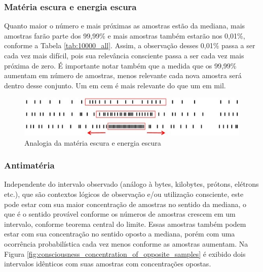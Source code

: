 \subsubsection{Matéria escura e energia escura}
Quanto maior o número e mais próximas as amostras estão da mediana, mais amostras farão parte dos 99,99\% e mais amostras também estarão nos 0,01\%, conforme a Tabela \ref{tab:10000_all}. Assim, a observação desses 0,01\% passa a ser cada vez mais difícil, pois sua relevância consciente passa a ser cada vez mais próxima de zero. É importante notar também que a medida que os 99,99\% aumentam em número de amostras, menos relevante cada nova amostra será dentro desse conjunto. Um em cem é mais relevante do que um em mil. 

\begin{figure}[H]
\caption{Analogia da matéria escura e energia escura}
\label{fig:consciousness_dark_matter_dark_energy}
\centering
\includegraphics[scale=1]{sections/images/consciousness_dark_matter_dark_energy.jpg}
\end{figure}

\subsubsection{Antimatéria}
Independente do intervalo observado (análogo à bytes, kilobytes, prótons, elétrons etc.), que são contextos lógicos de observação e/ou utilização consciente, este pode estar com sua maior concentração de amostras no sentido da mediana, o que é o sentido provável conforme os números de amostras crescem em um intervalo, conforme teorema central do limite. Essas amostras também podem estar com sua concentração no sentido oposto a mediana, porém com uma ocorrência probabilística cada vez menos conforme as amostras aumentam. Na Figura \ref{fig:consciousness_concentration_of_opposite_samples} é exibido dois intervalos idênticos com suas amostras com concentrações opostas.

